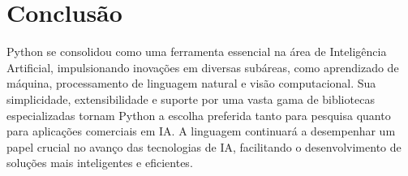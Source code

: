\section{Conclusão}
Python se consolidou como uma ferramenta essencial na área de Inteligência Artificial, impulsionando inovações em diversas subáreas, como aprendizado de máquina, processamento de linguagem natural e visão computacional. Sua simplicidade, extensibilidade e suporte por uma vasta gama de bibliotecas especializadas tornam Python a escolha preferida tanto para pesquisa quanto para aplicações comerciais em IA. A linguagem continuará a desempenhar um papel crucial no avanço das tecnologias de IA, facilitando o desenvolvimento de soluções mais inteligentes e eficientes.